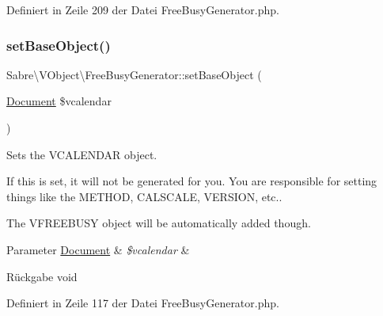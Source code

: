 Definiert in Zeile 209 der Datei Free\+Busy\+Generator.\+php.

\mbox{\label{class_sabre_1_1_v_object_1_1_free_busy_generator_a4434b3089a5bbc1c74adeed2406eaee7}} 
\subsubsection{\texorpdfstring{set\+Base\+Object()}{setBaseObject()}}
{\footnotesize\ttfamily Sabre\textbackslash{}\+V\+Object\textbackslash{}\+Free\+Busy\+Generator\+::set\+Base\+Object (\begin{DoxyParamCaption}\item[{\mbox{\hyperlink{class_sabre_1_1_v_object_1_1_document}{Document}}}]{\$vcalendar }\end{DoxyParamCaption})}

Sets the V\+C\+A\+L\+E\+N\+D\+AR object.

If this is set, it will not be generated for you. You are responsible for setting things like the M\+E\+T\+H\+OD, C\+A\+L\+S\+C\+A\+LE, V\+E\+R\+S\+I\+ON, etc..

The V\+F\+R\+E\+E\+B\+U\+SY object will be automatically added though.


\begin{DoxyParams}[1]{Parameter}
\mbox{\hyperlink{class_sabre_1_1_v_object_1_1_document}{Document}} & {\em \$vcalendar} & \\
\hline
\end{DoxyParams}
\begin{DoxyReturn}{Rückgabe}
void 
\end{DoxyReturn}


Definiert in Zeile 117 der Datei Free\+Busy\+Generator.\+php.

\mbox{\label{class_sabre_1_1_v_object_1_1_free_busy_generator_a5d68838b8d970c45f09b6e863bbcc0d4}} 
